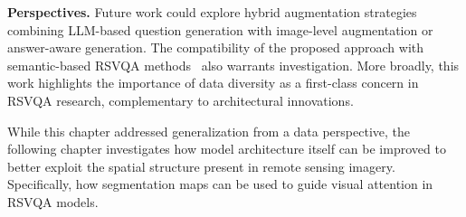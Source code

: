 \textbf{Perspectives.}
Future work could explore hybrid augmentation strategies
combining LLM-based question generation with image-level
augmentation or answer-aware generation. The compatibility
of the proposed approach with semantic-based RSVQA
methods~\cite{tosato2024segguided} also warrants
investigation. More broadly, this work highlights the
importance of data diversity as a first-class concern
in RSVQA research, complementary to architectural
innovations.
 
While this chapter addressed generalization from
a data perspective, the following chapter investigates
how model architecture itself can be improved to better
exploit the spatial structure present in remote sensing
imagery. Specifically, how segmentation maps can be
used to guide visual attention in RSVQA models.
 